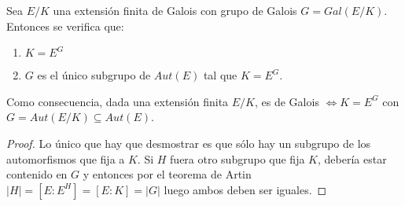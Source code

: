 \begin{proposition}
Sea $E/K$ una extensión finita de Galois con grupo de Galois $G = Gal(E/K)$. Entonces se verifica que:

\begin{enumerate}
\item $K = E^G$
\item $G$ es el único subgrupo de $Aut(E)$ tal que $K = E^G$. 
\end{enumerate}

Como consecuencia, dada una extensión finita $E/K$, es de Galois $\iff K = E^G$ con $G = Aut(E/K) \subseteq Aut(E)$.
\end{proposition}
\begin{proof}
Lo único que hay que desmostrar es que sólo hay un subgrupo de los automorfismos que fija a $K$. Si $H$ fuera otro subgrupo que fija $K$, debería estar contenido en $G$ y entonces por el teorema de Artin $|H| = [E:E^H] = [E:K] = |G|$ luego ambos deben ser iguales. 
\end{proof}


